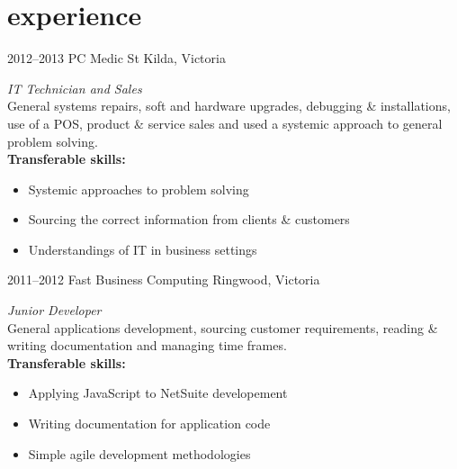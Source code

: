 \documentclass[]{friggeri-cv} %
\begin{document}
\section{experience}

\begin{entrylist}
\entry
{2012--2013}
{PC Medic}
{St Kilda, Victoria}
{\emph{IT Technician and Sales} \\
General systems repairs, soft and hardware upgrades, debugging \& installations, use of a POS, product \& service sales
and used a systemic approach to general problem solving. \\

\textbf{Transferable skills:}
\begin{itemize}
    \item Systemic approaches to problem solving
    \item Sourcing the correct information from clients \& customers
    \item Understandings of IT in business settings
\end{itemize}
}
\entry
{2011--2012}
{Fast Business Computing}
{Ringwood, Victoria}
{\emph{Junior Developer} \\
General applications development, sourcing customer requirements, reading \& writing documentation and managing time frames. \\

\textbf{Transferable skills:}
\begin{itemize}
    \item Applying JavaScript to NetSuite developement
    \item Writing documentation for application code
    \item Simple agile development methodologies
\end{itemize}
}
\end{entrylist}

\end{document}

